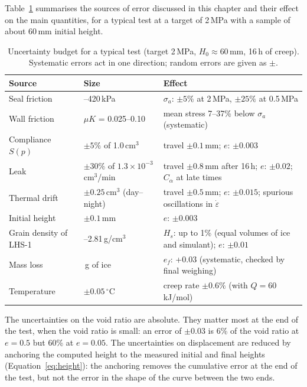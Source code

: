 Table~\ref{tab:uncertainty} summarises the sources of error discussed in this chapter and their effect on the main quantities, for a typical test at a target of 2\,MPa with a sample of about 60\,mm initial height.

\begin{table}[H]
    \centering
    \caption{Uncertainty budget for a typical test (target 2\,MPa, $H_0\approx60$\,mm, 16\,h of creep). Systematic errors act in one direction; random errors are given as $\pm$.}
    \label{tab:uncertainty}
    \footnotesize
    \renewcommand{\arraystretch}{1.15}
    \begin{tabularx}{\textwidth}{|>{\raggedright\arraybackslash}p{3.1cm}|>{\raggedright\arraybackslash}p{3.3cm}|>{\raggedright\arraybackslash}X|}
        \hline
        \textbf{Source} & \textbf{Size} & \textbf{Effect} \\
        \hline
        Seal friction & 210--420\,kPa & $\sigma_a$: $\pm5\%$ at 2\,MPa, $\pm25\%$ at 0.5\,MPa \\
        \hline
        Wall friction & $\mu K$ = 0.025--0.10 & mean stress 7--37\% below $\sigma_a$ (systematic) \\
        \hline
        Compliance $S(p)$ & $\pm5\%$ of 1.0\,cm$^3$ & travel $\pm0.1$\,mm; $e$: $\pm0.003$ \\
        \hline
        Leak & $\pm30\%$ of $1.3\times10^{-3}$\,cm$^3$/min & travel $\pm0.8$\,mm after 16\,h; $e$: $\pm0.02$; $C_\alpha$ at late times \\
        \hline
        Thermal drift & $\pm0.25$\,cm$^3$ (day--night) & travel $\pm0.5$\,mm; $e$: $\pm0.015$; spurious oscillations in $\dot\varepsilon$ \\
        \hline
        Initial height & $\pm0.1$\,mm & $e$: $\pm0.003$ \\
        \hline
        Grain density of LHS-1 & 2.75--2.81\,g/cm$^3$ & $H_s$: up to 1\% (equal volumes of ice and simulant); $e$: $\pm0.01$ \\
        \hline
        Mass loss & 0.5\,g of ice & $e_f$: +0.03 (systematic, checked by final weighing) \\
        \hline
        Temperature & $\pm0.05\,^\circ$C & creep rate $\pm0.6\%$ (with $Q = 60$\,kJ/mol) \\
        \hline
    \end{tabularx}
\end{table}

The uncertainties on the void ratio are absolute. They matter most at the end of the test, when the void ratio is small: an error of $\pm0.03$ is 6\% of the void ratio at $e = 0.5$ but 60\% at $e = 0.05$. The uncertainties on displacement are reduced by anchoring the computed height to the measured initial and final heights (Equation~\eqref{eq:height}): the anchoring removes the cumulative error at the end of the test, but not the error in the shape of the curve between the two ends.

